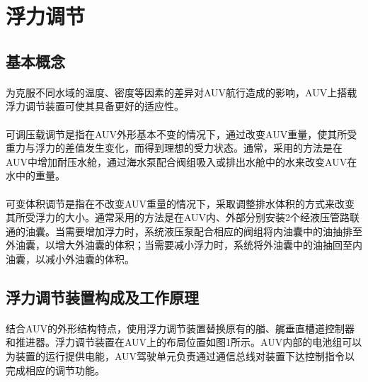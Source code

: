 \documentclass{ctexart}
\begin{document}
\section{浮力调节}
\subsection{基本概念}
\paragraph{}为克服不同水域的温度、密度等因素的差异对AUV航行造成的影响，AUV上搭载浮力调节装置可使其具备更好的适应性。
\paragraph{}可调压载调节是指在AUV外形基本不变的情况下，通过改变AUV重量，使其所受重力与浮力的差值发生变化，而得到理想的受力状态。通常，采用的方法是在AUV中增加耐压水舱，通过海水泵配合阀组吸入或排出水舱中的水来改变AUV在水中的重量。
\paragraph{}可变体积调节是指在不改变AUV重量的情况下，采取调整排水体积的方式来改变其所受浮力的大小。通常采用的方法是在AUV内、外部分别安装2个经液压管路联通的油囊。当需要增加浮力时，系统液压泵配合相应的阀组将内油囊中的油抽排至外油囊，以增大外油囊的体积；当需要减小浮力时，系统将外油囊中的油抽回至内油囊，以减小外油囊的体积。
\subsection{浮力调节装置构成及工作原理}
\paragraph{}结合AUV的外形结构特点，使用浮力调节装置替换原有的艏、艉垂直槽道控制器和推进器。浮力调节装置在AUV上的布局位置如图1所示。AUV内部的电池组可以为装置的运行提供电能，AUV驾驶单元负责通过通信总线对装置下达控制指令以完成相应的调节功能。
\end{document}
